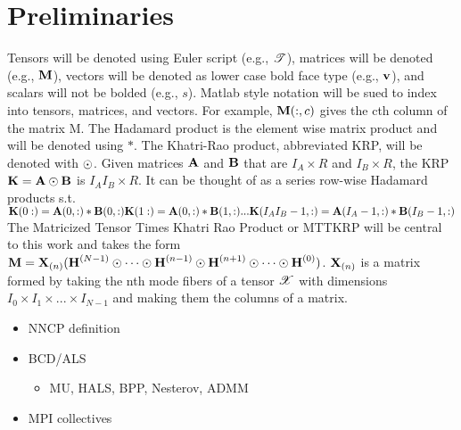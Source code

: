 
\section{Preliminaries} 
\label{sec:prelims}

Tensors will be denoted using Euler script (e.g., $\T{T}$), 
matrices will be denoted (e.g., $\M{M}$), vectors will be denoted as lower case bold face type 
(e.g., $\V{v}$), and scalars will not be bolded (e.g., $s$). 
Matlab style notation will be sued to index into tensors, matrices, and vectors. 
For example, $\M{M}(:,c)$ gives the cth column of the matrix M.
The Hadamard product is the element wise matrix product and will be denoted using $*$. 
The Khatri-Rao product, abbreviated KRP, will be denoted with $\odot$. 
Given matrices $\M{A}$ and $\M{B}$ that are $I_{A} \times R$ and $I_{B} \times R$, the KRP $\M{K} = \M{A} \Khat \M{B}$ is $I_{A}I_{B} \times R$. 
It can be thought of as a series row-wise Hadamard products s.t.
 \\$\M{K}(0:) = \M{A}(0,:) * \M{B}(0,:)\\ \M{K}(1:) = \M{A}(0,:) * \M{B}(1,:)  \\.\\.\\. \\ \M{K}(I_{A}I_{B} - 1,:) = \M{A}(I_{A}-1,:) * \M{B}(I_{B}-1,:)$ \\
 The Matricized Tensor Times Khatri Rao Product or MTTKRP will be central to this work and takes the form $\M{M} = \M{X}_{(n)}( \Mn{H}{N-1} \Khat \cdots \Khat \Mn{H}{n-1} \Khat \Mn{H}{n+1} \Khat  \cdots \Khat \Mn{H}{0})$. $\M{X}_{(n)}$ is a matrix formed by taking the nth mode fibers of a tensor $\T{X}$ with dimensions $I_{0} \times I_{1} \times ... \times I_{N-1}$ and making them the columns of a matrix. 
	

\begin{itemize}
	\item NNCP definition
	\item BCD/ALS
	\begin{itemize}
		\item MU, HALS, BPP, Nesterov, ADMM
	\end{itemize}
	\item MPI collectives
\end{itemize}

